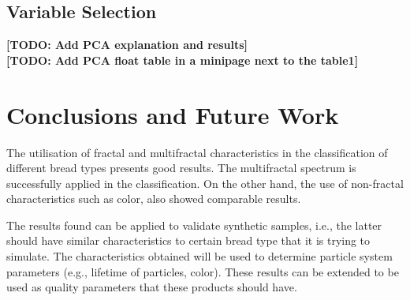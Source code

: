 \documentclass[oneside,a4paper,english,links]{amca}
\newcommand{\todo}[1]{\textbf{[TODO: #1]}}
\begin{document}
\subsection{Variable Selection}
\todo{Add PCA explanation and results} \\
\todo{Add PCA float table in a minipage next to the table1}

\section{Conclusions and Future Work}
The utilisation of fractal and multifractal characteristics in the classification of different bread types presents good results. The multifractal spectrum is successfully applied in the classification. On the other hand, the use of non-fractal characteristics such as color, also showed comparable results.

The results found can be applied to validate synthetic samples, i.e., the latter should have similar characteristics to certain bread type that it is trying to simulate. The characteristics obtained will be used to determine particle system parameters \cite{Baravalle2011} (e.g., lifetime of particles, color). These results can be extended to be used as quality parameters that these products should have.

%

\end{document}
